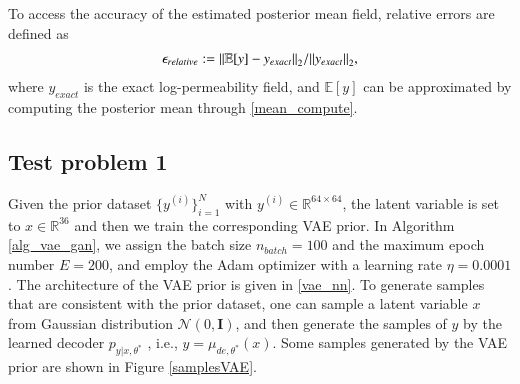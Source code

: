 To access the accuracy of the estimated posterior mean field, relative errors are defined as
\begin{align}\label{error_compute}
    \epsilon_{relative}:={\left\Arrowvert\mathbb{E}[y]-y_{exact}\right\Arrowvert}_2/{\Arrowvert y_{exact}\Arrowvert}_2,
\end{align}
where $y_{exact}$ is the exact log-permeability field, and $\mathbb{E}[y]$ can be approximated by computing the posterior mean through \eqref{mean_compute}.

\subsection{Test problem 1}
Given the prior dataset $\{y^{(i)}\}_{i=1}^N$ with $y^{(i)}\in\mathbb{R}^{ 64\times 64}$, the latent variable is set to $x\in \mathbb{R}^{36}$ and then we train the corresponding VAE prior. 
In Algorithm \ref{alg_vae_gan}, we assign the batch size $n_{batch} = 100$ and the maximum epoch number $E=200$, and 
employ the Adam optimizer with a learning rate $\eta=0.0001$. 
The architecture of the VAE prior is given in \ref{vae_nn}. 
To generate samples that are consistent with the prior dataset,  one can sample a latent variable $x$ from Gaussian distribution $\mathcal{N}(0,\mathbf{I})$, and then generate the samples of $y$ by the learned decoder $p_{y|x,\theta^*}$ , i.e., $y=\mu_{de,\theta^*}(x)$. Some samples generated by the VAE prior are shown in Figure \ref{samplesVAE}.
